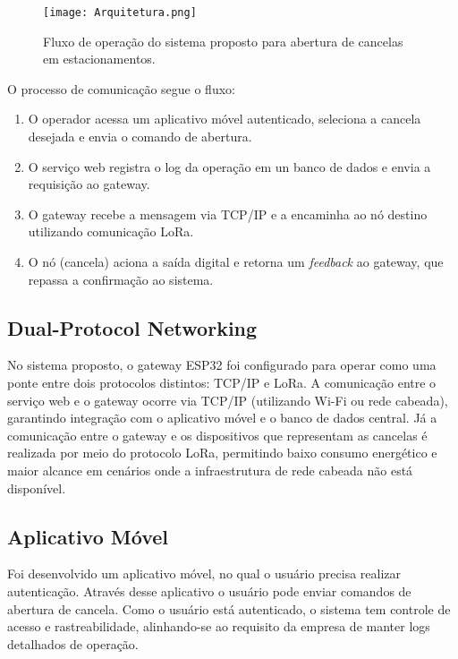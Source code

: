 \documentclass[
article,			%
11pt,				%
twoside,			%
a4paper,			%
section=TITLE,		%
onecolumn,          %
english,			%
brazil,				%
sumario=tradicional
]{abntex2}
\begin{document}
    \begin{figure}[htbp]
        \centering
        \texttt{[image: Arquitetura.png]}
        \caption{Fluxo de operação do sistema proposto para abertura de cancelas em estacionamentos.}
        \label{fig:fluxo_sistema}
    \end{figure}

    O processo de comunicação segue o fluxo:
    \begin{enumerate}
        \item O operador acessa um aplicativo móvel autenticado, seleciona a cancela desejada e envia o comando de abertura.
        \item O serviço web registra o log da operação em un banco de dados e envia a requisição ao gateway.
        \item O gateway recebe a mensagem via TCP/IP e a encaminha ao nó destino utilizando comunicação LoRa.
        \item O nó (cancela) aciona a saída digital e retorna um \textit{feedback} ao gateway, que repassa a confirmação ao sistema.
    \end{enumerate}
    
    \subsection{Dual-Protocol Networking}
    No sistema proposto, o gateway ESP32 foi configurado para operar como uma ponte entre dois protocolos distintos: TCP/IP e LoRa. 
    A comunicação entre o serviço web e o gateway ocorre via TCP/IP (utilizando Wi-Fi ou rede cabeada), garantindo integração com o aplicativo móvel e o banco de dados central. 
    Já a comunicação entre o gateway e os dispositivos que representam as cancelas é realizada por meio do protocolo LoRa, permitindo baixo consumo energético e maior alcance em cenários onde a infraestrutura de rede cabeada não está disponível.

    \subsection{Aplicativo Móvel}
    Foi desenvolvido um aplicativo móvel, no qual o usuário precisa realizar autenticação. Através desse aplicativo o usuário pode enviar comandos de abertura de cancela. Como o usuário está autenticado, o sistema tem controle de acesso e rastreabilidade, alinhando-se ao requisito da empresa de manter logs detalhados de operação.
    
\end{document}
